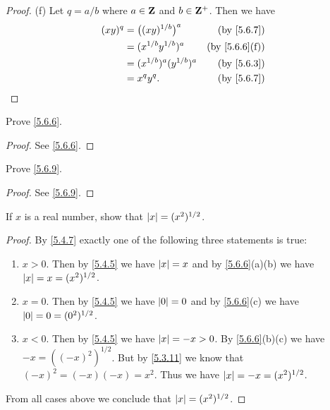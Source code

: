 \begin{proof}{(f)}
  Let \(q = a / b\) where \(a \in \mathbf{Z}\) and \(b \in \mathbf{Z}^+\).
  Then we have
  \begin{align*}
    (xy)^q & = \big((xy)^{1 / b}\big)^a    & \text{(by \cref{5.6.7})}    \\
           & = (x^{1 / b} y^{1 / b})^a     & \text{(by \cref{5.6.6}(f))} \\
           & = (x^{1 / b})^a (y^{1 / b})^a & \text{(by \cref{5.6.3})}    \\
           & = x^q y^q.                    & \text{(by \cref{5.6.7})}
  \end{align*}
\end{proof}

\exercisesection

\begin{exercise}\label{ex 5.6.1}
  Prove \cref{5.6.6}.
\end{exercise}

\begin{proof}
  See \cref{5.6.6}.
\end{proof}

\begin{exercise}\label{ex 5.6.2}
  Prove \cref{5.6.9}.
\end{exercise}

\begin{proof}
  See \cref{5.6.9}.
\end{proof}

\begin{exercise}\label{ex 5.6.3}
  If \(x\) is a real number, show that \(\left\lvert x\right\rvert = (x^2)^{1 / 2}\).
\end{exercise}

\begin{proof}
  By \cref{5.4.7} exactly one of the following three statements is true:
  \begin{enumerate}
    \item \(x > 0\).
          Then by \cref{5.4.5} we have \(\left\lvert x\right\rvert = x\) and by \cref{5.6.6}(a)(b) we have \(\left\lvert x\right\rvert = x = (x^2)^{1 / 2}\).
    \item \(x = 0\).
          Then by \cref{5.4.5} we have \(\left\lvert0\right\rvert = 0\) and by \cref{5.6.6}(c) we have \(\left\lvert0\right\rvert = 0 = (0^2)^{1 / 2}\).
    \item \(x < 0\).
          Then by \cref{5.4.5} we have \(\left\lvert x\right\rvert = -x > 0\).
          By \cref{5.6.6}(b)(c) we have \(-x = ((-x)^2)^{1 / 2}\).
          But by \cref{5.3.11} we know that \((-x)^2 = (-x)(-x) = x^2\).
          Thus we have \(\left\lvert x\right\rvert = -x = (x^2)^{1 / 2}\).
  \end{enumerate}
  From all cases above we conclude that \(\left\lvert x\right\rvert = (x^2)^{1 / 2}\).
\end{proof}